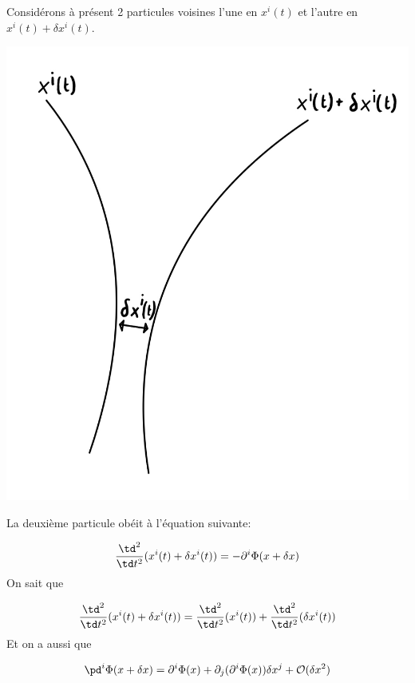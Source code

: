 Considérons à présent 2 particules voisines l'une en $x^{i}(t)$ et l'autre en $x^{i}(t) + \delta x^{i}(t)$. 

\begin{center} \includegraphics[scale=0.15]{Chapitres/5. Géodésiques/Images/mouvement infinitésimal.jpg} 
\end{center}

La deuxième particule obéit à l'équation suivante:

\begin{equation}
    \frac{\td ^2}{\td t^2}(x^{i}(t) + \delta x^{i}(t)) = -\partial^{i}\Phi(x + \delta x)
\end{equation}
On sait que 

\begin{equation}
    \frac{\td ^2}{\td t^2}(x^{i}(t) + \delta x^{i}(t))= \frac{\td ^2}{\td t^2}(x^{i}(t) ) + \frac{\td ^2}{\td t^2}(\delta x^{i}(t))
\end{equation}
Et on a aussi que

\begin{equation}
    \pd^i \Phi(x+\delta x) = \partial^{i}\Phi(x) + \partial_{j}(\partial^{i}\Phi(x))\delta x^{j}+\mathcal{O}(\delta x^2)
\end{equation}

